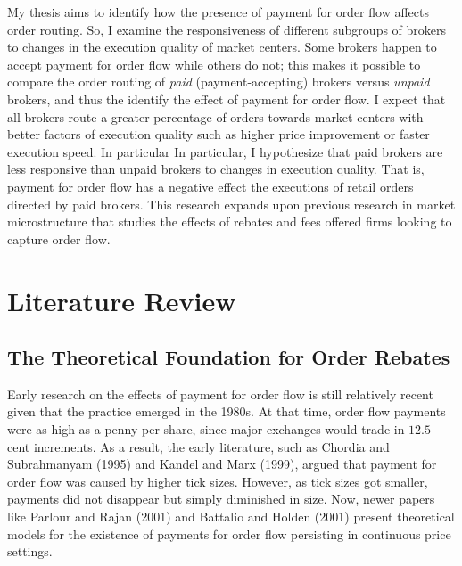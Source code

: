 \documentclass[12pt,a4paper]{article}
\begin{document}
My thesis aims to identify how the presence of payment for order flow affects order routing. 
So, I examine the responsiveness of different subgroups of brokers to changes in the execution quality of market centers. 
Some brokers happen to accept payment for order flow while others do not; this makes it possible to compare the order routing of \textit{paid} (payment-accepting) brokers versus \textit{unpaid} brokers, and thus the identify the effect of payment for order flow. 
I expect that all brokers route a greater percentage of orders towards market centers with better factors of execution quality such as higher price improvement or faster execution speed. In particular
In particular, I hypothesize that paid brokers are less responsive than unpaid brokers to changes in execution quality. That is, payment for order flow has a negative effect the executions of retail orders directed by paid brokers. This research expands upon previous research in market microstructure that studies the effects of rebates and fees offered firms looking to capture order flow.  



\section{Literature Review}	

\subsection{The Theoretical Foundation for Order Rebates}

Early research on the effects of payment for order flow is still relatively recent given that the practice emerged in the 1980s. At that time, order flow payments were as high as a penny per share, since major exchanges would trade in $12.5$ cent increments. As a result, the early literature, such as Chordia and Subrahmanyam (1995) and Kandel and Marx (1999), argued that payment for order flow was caused by higher tick sizes. However, as tick sizes got smaller, payments did not disappear but simply diminished in size. Now, newer papers like Parlour and Rajan (2001) and Battalio and Holden (2001) present theoretical models for the existence of payments for order flow persisting in continuous price settings. 
\end{document}
